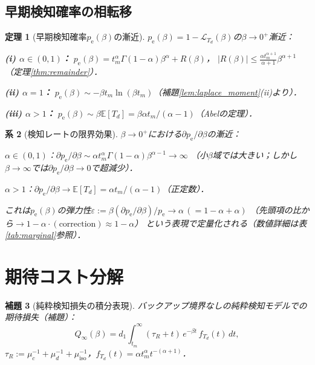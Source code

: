 \documentclass[12pt,a4paper]{article}
\theoremstyle{plain}
\newtheorem{theorem}{定理}[section]
\newtheorem{lemma}[theorem]{補題}
\newtheorem{corollary}[theorem]{系}
\theoremstyle{definition}
\theoremstyle{remark}
\newcommand{\E}{\mathbb{E}}
\newcommand{\calL}{\mathcal{L}}
\newcommand{\pe}{p_{\mathrm{e}}}
\newcommand{\Qinf}{Q_{\infty}}
\begin{document}
\subsection{早期検知確率の相転移}

\begin{theorem}[早期検知確率$\pe(\beta)$の漸近]\label{thm:phase_pe}
$\pe(\beta)=1-\calL_{T_d}(\beta)$の$\beta\to0^+$漸近：

\noindent\textbf{(i) $\alpha\in(0,1)$：}
$\pe(\beta)= t_m^\alpha\Gamma(1-\alpha)\beta^\alpha+R(\beta)$，
$|R(\beta)|\le\frac{\alpha t_m^{\alpha+1}}{\alpha+1}\beta^{\alpha+1}$（定理\ref{thm:remainder}）．

\noindent\textbf{(ii) $\alpha=1$：}
$\pe(\beta)\sim -\beta t_m\ln(\beta t_m)$（補題\ref{lem:laplace_moment}(ii)より）．

\noindent\textbf{(iii) $\alpha>1$：}
$\pe(\beta)\sim\beta\E[T_d]=\beta\alpha t_m/(\alpha-1)$（Abelの定理）．

\end{theorem}

\begin{corollary}[検知レートの限界効果]\label{cor:marginal}
$\beta\to0^+$における$\partial\pe/\partial\beta$の漸近：

\noindent$\alpha\in(0,1)$：$\partial\pe/\partial\beta\sim\alpha t_m^\alpha\Gamma(1-\alpha)\beta^{\alpha-1}\to\infty$
（小$\beta$域では大きい；しかし$\beta\to\infty$では$\partial\pe/\partial\beta\to0$で超減少）．

\noindent$\alpha>1$：$\partial\pe/\partial\beta\to\E[T_d]=\alpha t_m/(\alpha-1)$（正定数）．

これは$\pe(\beta)$の弾力性$\varepsilon:=\beta(\partial\pe/\partial\beta)/\pe\to\alpha\,(=1-\alpha+\alpha)$
（先頭項の比から$\to1-\alpha\cdot(\text{correction})\approx 1-\alpha$）
という表現で定量化される（数値詳細は表\ref{tab:marginal}参照）．
\end{corollary}

\section{期待コスト分解}
\label{sec:cost}

\begin{lemma}[純粋検知損失の積分表現]\label{lem:loss_rep}
バックアップ境界なしの純粋検知モデルでの期待損失（補題）：
\begin{equation}\label{eq:Q_inf_formula}
\Qinf(\beta) = d_1\int_{t_m}^\infty(\tau_R+t)\,e^{-\beta t}\,f_{T_d}(t)\,dt,
\end{equation}
$\tau_R:=\mu_c^{-1}+\mu_d^{-1}+\mu_{\mathrm{iso}}^{-1}$，$f_{T_d}(t)=\alpha t_m^\alpha t^{-(\alpha+1)}$．
\end{lemma}
\end{document}
